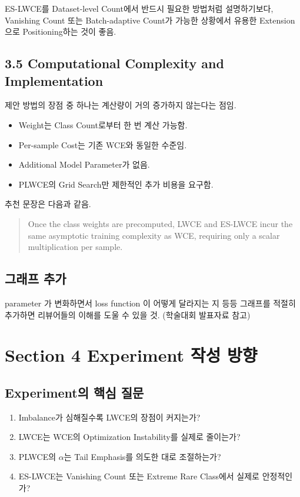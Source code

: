 \documentclass[11pt,a4paper]{article}
\begin{document}
\begin{tcolorbox}[title=개선 방향]
ES-LWCE를 Dataset-level Count에서 반드시 필요한 방법처럼 설명하기보다, Vanishing Count 또는 Batch-adaptive Count가 가능한 상황에서 유용한 Extension으로 Positioning하는 것이 좋음.
\end{tcolorbox}

\subsection{3.5 Computational Complexity and Implementation}

제안 방법의 장점 중 하나는 계산량이 거의 증가하지 않는다는 점임.

\begin{itemize}
\item Weight는 Class Count로부터 한 번 계산 가능함.
\item Per-sample Cost는 기존 WCE와 동일한 수준임.
\item Additional Model Parameter가 없음.
\item PLWCE의 Grid Search만 제한적인 추가 비용을 요구함.
\end{itemize}

추천 문장은 다음과 같음.

\begin{quote}
Once the class weights are precomputed, LWCE and ES-LWCE incur the same asymptotic training complexity as WCE, requiring only a scalar multiplication per sample.
\end{quote}

\subsection{그래프 추가}

parameter 가 변화하면서 loss function 이 어떻게 달라지는 지 등등 그래프를 적절히 추가하면 리뷰어들의 이해를 도울 수 있을 것. (학술대회 발표자료 참고)

\section{Section 4 Experiment 작성 방향}

\subsection{Experiment의 핵심 질문}

\begin{enumerate}
\item Imbalance가 심해질수록 LWCE의 장점이 커지는가?
\item LWCE는 WCE의 Optimization Instability를 실제로 줄이는가?
\item PLWCE의 \(\alpha\)는 Tail Emphasis를 의도한 대로 조절하는가?
\item ES-LWCE는 Vanishing Count 또는 Extreme Rare Class에서 실제로 안정적인가?
\end{enumerate}
\end{document}
